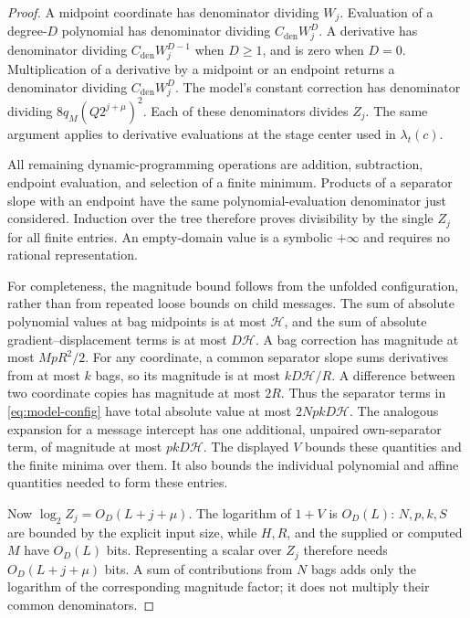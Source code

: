 \begin{proof}
A midpoint coordinate has denominator dividing $W_j$.  Evaluation of a
degree-$D$ polynomial has denominator dividing $C_{\mathrm{den}}W_j^D$.
A derivative has denominator dividing $C_{\mathrm{den}}W_j^{D-1}$ when
$D\ge1$, and is zero when $D=0$.
Multiplication of a derivative by a midpoint or an endpoint returns a
denominator dividing $C_{\mathrm{den}}W_j^D$.  The model's constant correction has
denominator dividing $8q_M(Q2^{j+\mu})^2$.  Each of these denominators
divides $Z_j$.  The same argument applies to derivative evaluations at the
stage center used in $\lambda_t(c)$.

All remaining dynamic-programming operations are addition, subtraction,
endpoint evaluation, and selection of a finite minimum.  Products of a
separator slope with an endpoint have the same polynomial-evaluation
denominator just considered.  Induction over the tree therefore proves
divisibility by the single $Z_j$ for all finite entries.  An empty-domain
value is a symbolic $+\infty$ and requires no rational representation.

For completeness, the magnitude bound follows from the unfolded
configuration, rather than from repeated loose bounds on child messages.
The sum of absolute polynomial values at bag midpoints is at most
$\mathcal H$, and the sum of absolute gradient--displacement terms is at
most $D\mathcal H$.  A bag correction has magnitude at most $MpR^2/2$.
For any coordinate, a common separator slope sums derivatives from at most
$k$ bags, so its magnitude is at most $kD\mathcal H/R$.  A difference
between two coordinate copies has magnitude at most $2R$.  Thus the
separator terms in \cref{eq:model-config} have total absolute value at most
$2NpkD\mathcal H$.  The analogous expansion for a message intercept has
one additional, unpaired own-separator term, of magnitude at most
$pkD\mathcal H$.  The displayed $V$ bounds these quantities and the finite
minima over them.  It also bounds the individual polynomial and affine
quantities needed to form these entries.

Now $\log_2 Z_j=O_D(L+j+\mu)$.  The logarithm of $1+V$ is $O_D(L)$:
$N,p,k,S$ are bounded by the explicit input size, while $H,R$, and the
supplied or computed $M$ have $O_D(L)$ bits.  Representing a scalar over
$Z_j$ therefore needs $O_D(L+j+\mu)$ bits.  A sum of contributions from
$N$ bags adds only the logarithm of the corresponding magnitude factor;
it does not multiply their common denominators.
\end{proof}


